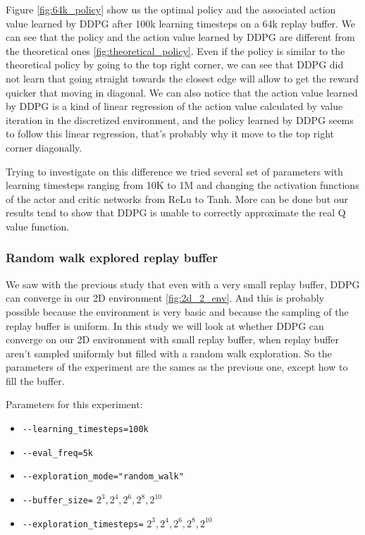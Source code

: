 \documentclass{article}
\begin{document}
Figure \ref{fig:64k_policy} show us the optimal policy and the associated action value learned by DDPG after 100k learning timesteps on a 64k replay buffer. We can see that the policy and the action value learned by DDPG are different from the theoretical ones \ref{fig:theoretical_policy}. Even if the policy is similar to the theoretical policy by going to the top right corner, we can see that DDPG did not learn that going straight towards the closest edge will allow to get the reward quicker that moving in diagonal. We can also notice that the action value learned by DDPG is a kind of linear regression of the action value calculated by value iteration in the discretized environment, and the policy learned by DDPG seems to follow this linear regression, that's probably why it move to the top right corner diagonally.

Trying to investigate on this difference we tried several set of parameters with learning timesteps ranging from 10K to 1M and changing the activation functions of the actor and critic networks from ReLu to Tanh. More can be done but our results tend to show that DDPG is unable to correctly approximate the real Q value function.


\subsubsection{Random walk explored replay buffer}

We saw with the previous study that even with a very small replay buffer, DDPG can converge in our 2D environment \ref{fig:2d_2_env}. And this is probably possible because the environment is very basic and because the sampling of the replay buffer is uniform. In this study we will look at whether DDPG can converge on our 2D environment with small replay buffer, when replay buffer aren't sampled uniformly but filled with a random walk exploration. So the parameters of the experiment are the sames as the previous one, except how to fill the buffer.

Parameters for this experiment:
\begin{itemize}
    \item[] \lstinline|--learning_timesteps=100k|
    \item[] \lstinline|--eval_freq=5k|
    \item[] \lstinline|--exploration_mode="random_walk"|
    \item[] \lstinline|--buffer_size=| $2^3, 2^4, 2^6, 2^8, 2^{10}$
    \item[] \lstinline|--exploration_timesteps=| $2^3, 2^4, 2^6, 2^8, 2^{10}$
\end{itemize}
\end{document}
